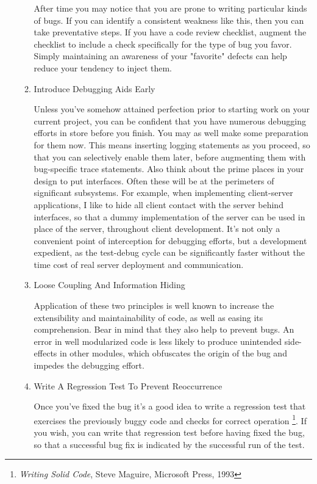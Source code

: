 \documentclass{article}
\begin{document}
\begin{enumerate}
\begin{enumerate}
After time you may notice that you are prone to writing particular kinds
of bugs. If you can identify a consistent weakness like this, then you
can take preventative steps. If you have a code review checklist,
augment the checklist to include a check specifically for the type of
bug you favor. Simply maintaining an awareness of your "favorite"
defects can help reduce your tendency to inject them.

\item Introduce Debugging Aids Early
\label{sec:orgheadline331}

Unless you've somehow attained perfection prior to starting work on your
current project, you can be confident that you have numerous debugging
efforts in store before you finish. You may as well make some
preparation for them now. This means inserting logging statements as you
proceed, so that you can selectively enable them later, before
augmenting them with bug-specific trace statements. Also think about the
prime places in your design to put interfaces. Often these will be at
the perimeters of significant subsystems. For example, when implementing
client-server applications, I like to hide all client contact with the
server behind interfaces, so that a dummy implementation of the server
can be used in place of the server, throughout client development. It's
not only a convenient point of interception for debugging efforts, but a
development expedient, as the test-debug cycle can be significantly
faster without the time cost of real server deployment and
communication.

\item Loose Coupling And Information Hiding
\label{sec:orgheadline332}

Application of these two principles is well known to increase the
extensibility and maintainability of code, as well as easing its
comprehension. Bear in mind that they also help to prevent bugs. An
error in well modularized code is less likely to produce unintended
side-effects in other modules, which obfuscates the origin of the bug
and impedes the debugging effort.

\item Write A Regression Test To Prevent Reoccurrence
\label{sec:orgheadline333}

Once you've fixed the bug it's a good idea to write a regression test
that exercises the previously buggy code and checks for correct
operation \footnote{\emph{Writing Solid Code}, Steve Maguire, Microsoft Press, 1993}. If you wish, you can write that regression test before
having fixed the bug, so that a successful bug fix is indicated by the
successful run of the test.
\end{enumerate}


\end{enumerate}
\end{document}
